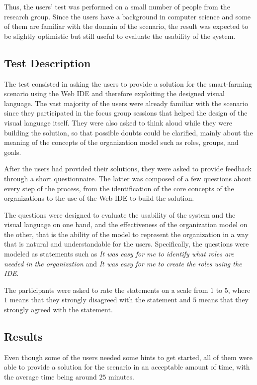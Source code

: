 Thus, the users' test was performed on a small number of people from the research group.
Since the users have a background in computer science and some of them are familiar with the domain of the scenario, the result was expected to be slightly optimistic but still useful to evaluate the usability of the system.

\subsection{Test Description}
The test consisted in asking the users to provide a solution for the smart-farming scenario using the Web IDE and therefore exploiting the designed visual language.
The vast majority of the users were already familiar with the scenario since they participated in the focus group sessions that helped the design of the visual language itself.
They were also asked to think aloud while they were building the solution, so that possible doubts could be clarified, mainly about the meaning of the concepts of the organization model such as roles, groups, and goals.

After the users had provided their solutions, they were asked to provide feedback through a short questionnaire.
The latter was composed of a few questions about every step of the process, from the identification of the core concepts of the organizations to the use of the Web IDE to build the solution.

The questions were designed to evaluate the usability of the system and the visual language on one hand, and the effectiveness of the organization model on the other, that is the ability of the model to represent the organization in a way that is natural and understandable for the users.
Specifically, the questions were modeled as statements such as \textit{It was easy for me to identify what roles are needed in the organization} and \textit{It was easy for me to create the roles using the IDE}.

The participants were asked to rate the statements on a scale from $1$ to $5$, where $1$ means that they strongly disagreed with the statement and $5$ means that they strongly agreed with the statement.

\subsection{Results}
Even though some of the users needed some hints to get started, all of them were able to provide a solution for the scenario in an acceptable amount of time, with the average time being around $25$ minutes.

